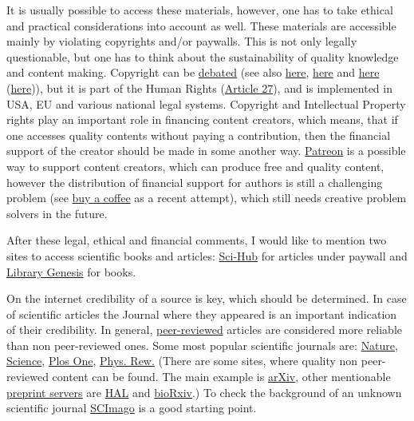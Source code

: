 \documentclass{article}
\begin{document}
It is usually possible to access these materials, however, one has to take ethical and practical considerations into account as well.
These materials are accessible mainly by violating copyrights and/or paywalls. This is not only legally questionable, but one has to think about the sustainability of quality knowledge and content making. Copyright can be \href{https://link.springer.com/chapter/10.1007/978-981-10-3984-3_7}{debated} (see also \href{https://www.youtube.com/watch?v=rFMl0stqai0}{here}, \href{https://en.wikipedia.org/wiki/Criticism_of_copyright}{here} and \href{https://en.wikipedia.org/wiki/Right_to_science_and_culture}{here} (\href{https://www.ted.com/talks/lawrence_lessig_laws_that_choke_creativity}{here})), but it is part of the Human Rights (\href{https://www.humanrights.com/what-are-human-rights/videos/copyright.html}{Article 27}), and is implemented in USA, EU and various national legal systems. Copyright and Intellectual Property rights play an important role in financing content creators, which means, that if one accesses quality contents without paying a contribution, then the financial support of the creator should be made in some another way.
\href{https://www.patreon.com/}{Patreon} is a possible way to support content creators, which can produce free and quality content, however the distribution of financial support for authors is still a challenging problem (see \href{https://ko-fi.com/}{buy a coffee} as a recent attempt), which still needs creative problem solvers in the future.

After these legal, ethical and financial comments, I would like to mention two sites to access scientific books and articles: \href{https://en.wikipedia.org/wiki/Sci-Hub}{Sci-Hub} for articles under paywall and \href{https://en.wikipedia.org/wiki/Library_Genesis}{Library Genesis} for books.

On the internet credibility of a source is key, which should be determined. In case of scientific articles the Journal where they appeared is an important indication of their credibility. In general, \href{https://en.wikipedia.org/wiki/Peer_review}{peer-reviewed} articles are considered more reliable than non peer-reviewed ones. Some most popular scientific journals are: \href{https://www.nature.com/}{Nature}, \href{https://www.sciencemag.org/}{Science}, \href{https://journals.plos.org/plosone/}{Plos One}, \href{https://journals.aps.org/}{Phys. Rew.} (There are some sites, where quality non peer-reviewed content can be found. The main example is \href{https://arxiv.org/}{arXiv}, other mentionable \href{https://en.wikipedia.org/wiki/List_of_preprint_repositories}{preprint servers} are \href{https://hal.archives-ouvertes.fr/}{HAL} and \href{https://www.biorxiv.org/}{bioRxiv}.) To check the background of an unknown scientific journal \href{https://www.scimagojr.com/}{SCImago} is a good starting point.
\end{document}
